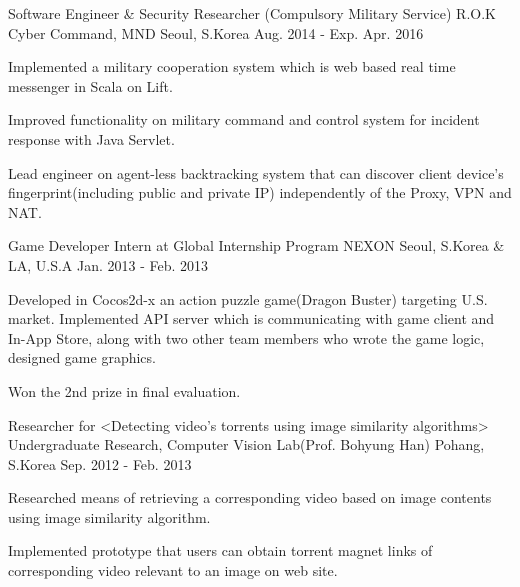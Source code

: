 
\begin{cventries}

  \cventry
  {Software Engineer \& Security Researcher (Compulsory Military Service)} %
  {R.O.K Cyber Command, MND} %
  {Seoul, S.Korea} %
  {Aug. 2014 - Exp. Apr. 2016} %
  {
    \begin{cvitems} %
    \item {Implemented a military cooperation system which is web based real time messenger in Scala on Lift.}
    \item {Improved functionality on military command and control system for incident response with Java Servlet.}
    \item {Lead engineer on agent-less backtracking system that can discover client device's fingerprint(including public and private IP) independently of the Proxy, VPN and NAT.}
    \end{cvitems}
  }

  \cventry
  {Game Developer Intern at Global Internship Program} %
  {NEXON} %
  {Seoul, S.Korea \& LA, U.S.A} %
  {Jan. 2013 - Feb. 2013} %
  {
    \begin{cvitems} %
    \item {Developed in Cocos2d-x an action puzzle game(Dragon Buster) targeting U.S. market. Implemented API server which is communicating with game client and In-App Store, along with two other team members who wrote the game logic, designed game graphics.}
    \item {Won the 2nd prize in final evaluation.}
    \end{cvitems}
  }

  \cventry
  {Researcher for <Detecting video’s torrents using image similarity algorithms>} %
  {Undergraduate Research, Computer Vision Lab(Prof. Bohyung Han)} %
  {Pohang, S.Korea} %
  {Sep. 2012 - Feb. 2013} %
  {
    \begin{cvitems} %
    \item {Researched means of retrieving a corresponding video based on image contents using image similarity algorithm.}
    \item {Implemented prototype that users can obtain torrent magnet links of corresponding video relevant to an image on web site.}
    \end{cvitems}
  }


\end{cventries}
